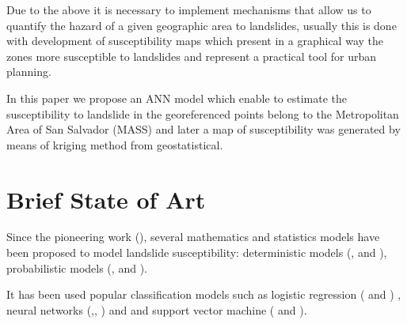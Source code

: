 \documentclass[11pt,twoside]{rmta2010esp}%
\begin{document}
Due to the above it is necessary to implement mechanisms that allow us to quantify the hazard of a given
geographic area to landslides, usually this is done with development of susceptibility maps which present in a graphical way
the zones more susceptible to landslides and represent a practical tool for urban planning.


%
%
%
In this paper we propose an ANN model which enable to estimate the susceptibility to landslide in the georeferenced points belong to the Metropolitan Area of San Salvador (MASS) and later a map of susceptibility was generated by means of kriging method from geostatistical. 







\section{Brief State of Art}
\label{sec:brief}
Since the pioneering work (\cite{Carrara1983403}), several mathematics and statistics models have been proposed to model landslide susceptibility: deterministic models (\cite{hessd-10-12643-2013},  \cite{doi:10.1080/19475705.2010.498151} and \cite{Neu2012511}), probabilistic models (\cite{Bern198839}, \cite{Chung2003451} and \cite{doi:10.1080/01431160310001618734} ). 

It has been used popular classification models such as logistic regression (\cite{akgun2012} and \cite{gaskill} ) , neural networks (\cite{Melchiorre2011410},\cite{Zeng2001374}, \cite{Ermini2005327}) and \cite{Yesilnacar2005251} and support vector machine (\cite{ballabio2012support} and \cite{tien2012landslide}). 
\end{document}
